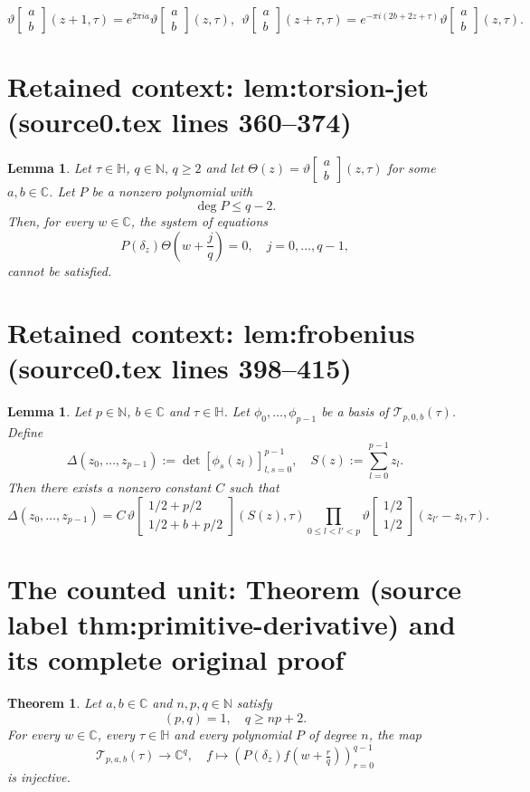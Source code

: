 \documentclass[10pt,a4paper]{amsart}
\newcommand{\C}{\mathbb C}
\newcommand{\HH}{\mathbb H}
\newcommand{\N}{\mathbb N}
\newcommand{\calT}{\mathcal T}
\newcommand{\dd}{\delta}
\newcommand{\thetac}[2]{{\vartheta\left[\begin{smallmatrix}
        #1 \\ #2
    \end{smallmatrix}\right]}}
\theoremstyle{plain}
\newtheorem{theorem}[definition]{Theorem}
\newtheorem{lemma}[definition]{Lemma}
\begin{document}
\begin{equation}\label{eq:thetac_quasip}
\thetac{a}{b}(z+1,\tau)=e^{2\pi i a}\thetac{a}{b}(z,\tau),
\ \
\thetac{a}{b}(z+\tau,\tau)=e^{-\pi i(2b+2z +\tau)}\thetac{a}{b}(z,\tau).
\end{equation}


\section*{Retained context: lem:torsion-jet (source0.tex lines 360--374)}

\begin{lemma}\label{lem:torsion-jet}
Let $\tau\in\HH$, $q\in\N, \, q\geq 2$ and let 
$\Theta(z) = \thetac{a}{b}(z,\tau)$ for some $a,b\in\C$.
Let $P$ be a
nonzero polynomial with
$$
\deg P\leq q-2.
$$
Then, for every $w\in\C$, the system of equations
\begin{equation}\label{eq:impossible_system}
    P(\dd_z)\Theta\left(w+\frac{j}{q}\right)=0,
\quad j=0,\dots,q-1,
\end{equation}
cannot be satisfied.
\end{lemma}


\section*{Retained context: lem:frobenius (source0.tex lines 398--415)}

\begin{lemma}
\label{lem:frobenius}
Let $p\in\N$, $b\in\C$ and $\tau\in\HH$.
Let $\phi_0,\dots,\phi_{p-1}$ be a basis of $\calT_{p,0,b}(\tau)$. Define
$$
\Delta(z_0,\dots,z_{p-1})
:=
\det[\phi_s(z_l)]_{l,s=0}^{p-1},
\quad
S(z):=\sum_{l=0}^{p-1}z_{l}.
$$
Then there exists a nonzero constant $C$ such that
$$
\Delta(z_0,\dots,z_{p-1})
=
C\, \thetac{1/2+p/2}{1/2+b+p/2}(S(z), \tau) \prod\limits_{0\leq l <l'< p}\thetac{1/2}{1/2}(z_{l'}-z_l,\tau).
$$
\end{lemma}


\section{The counted unit: Theorem (source label thm:primitive-derivative) and its complete original proof}

\begin{theorem}\label{thm:primitive-derivative}
Let $a,b\in\C$ and $n,p,q\in\N$ satisfy
$$
(p,q)=1,
\quad
q\geq {n}p+2.
$$
For every $w\in\C$, every $\tau \in \mathbb H$ and every polynomial $P$ of degree $n$, the map
$$
\calT_{p,a,b}(\tau)\to \C^q,
\quad
f \mapsto
\left({P(\dd_z)} f\left(w+\tfrac{r}{q}\right)\right)_{r=0}^{q-1}
$$
is injective.
\end{theorem}
\end{document}
